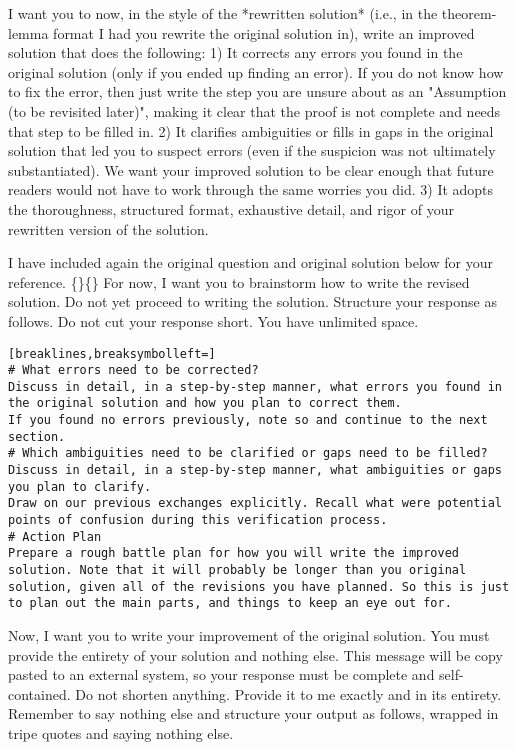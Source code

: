 \begin{tcolorbox}[breakable,title=Verification Prompt 8]
I want you to now, in the style of the *rewritten solution* (i.e., in the theorem-lemma format I had you rewrite the original solution in), write an improved solution that does the following:
1) It corrects any errors you found in the original solution (only if you ended up finding an error). If you do not know how to fix the error, then just write the step you are unsure about as an "Assumption (to be revisited later)", making it clear that the proof is not complete and needs that step to be filled in.
2) It clarifies ambiguities or fills in gaps in the original solution that led you to suspect errors (even if the suspicion was not ultimately substantiated). We want your improved solution to be clear enough that future readers would not have to work through the same worries you did.
3) It adopts the thoroughness, structured format, exhaustive detail, and rigor of your rewritten version of the solution.

I have included again the original question and original solution below for your reference. \{\}\{\}
For now, I want you to brainstorm how to write the revised solution. Do not yet proceed to writing the solution. Structure your response as follows. Do not cut your response short. You have unlimited space.
\begin{Verbatim}[breaklines,breaksymbolleft=]
# What errors need to be corrected?
Discuss in detail, in a step-by-step manner, what errors you found in the original solution and how you plan to correct them.
If you found no errors previously, note so and continue to the next section.
# Which ambiguities need to be clarified or gaps need to be filled?
Discuss in detail, in a step-by-step manner, what ambiguities or gaps you plan to clarify.
Draw on our previous exchanges explicitly. Recall what were potential points of confusion during this verification process.
# Action Plan
Prepare a rough battle plan for how you will write the improved solution. Note that it will probably be longer than you original solution, given all of the revisions you have planned. So this is just to plan out the main parts, and things to keep an eye out for.
\end{Verbatim}
\end{tcolorbox}

\begin{tcolorbox}[breakable,title=Verification Prompt 9]
Now, I want you to write your improvement of the original solution. You must provide the entirety of your solution and nothing else. This message will be copy pasted to an external system, so your response must be complete and self-contained. Do not shorten anything. Provide it to me exactly and in its entirety. Remember to say nothing else and structure your output as follows, wrapped in tripe quotes and saying nothing else.
\end{tcolorbox}

